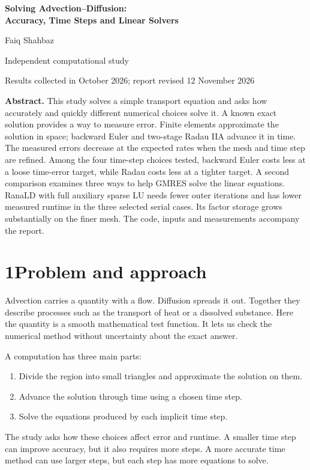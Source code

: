 \documentclass[11pt,a4paper]{article}
\begin{document}
\begin{center}
{\LARGE\bfseries Solving Advection--Diffusion:\\Accuracy, Time Steps and Linear Solvers\par}
\vspace{5mm}
{\large Faiq Shahbaz}\par
Independent computational study\par
Results collected in October 2026; report revised 12 November 2026
\end{center}
\vspace{2mm}
\textbf{Abstract.} This study solves a simple transport equation and asks how accurately and quickly different numerical choices solve it. A known exact solution provides a way to measure error. Finite elements approximate the solution in space; backward Euler and two-stage Radau IIA advance it in time. The measured errors decrease at the expected rates when the mesh and time step are refined. Among the four time-step choices tested, backward Euler costs less at a loose time-error target, while Radau costs less at a tighter target. A second comparison examines three ways to help GMRES solve the linear equations. RanaLD with full auxiliary sparse LU needs fewer outer iterations and has lower measured runtime in the three selected serial cases. Its factor storage grows substantially on the finer mesh. The code, inputs and measurements accompany the report.

\section*{1\quad Problem and approach}
Advection carries a quantity with a flow. Diffusion spreads it out. Together they describe processes such as the transport of heat or a dissolved substance. Here the quantity is a smooth mathematical test function. It lets us check the numerical method without uncertainty about the exact answer.

A computation has three main parts:
\begin{enumerate}
\item Divide the region into small triangles and approximate the solution on them.
\item Advance the solution through time using a chosen time step.
\item Solve the equations produced by each implicit time step.
\end{enumerate}
The study asks how these choices affect error and runtime. A smaller time step can improve accuracy, but it also requires more steps. A more accurate time method can use larger steps, but each step has more equations to solve.
\end{document}
